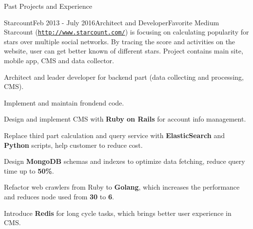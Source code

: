 \documentclass{resume} %
\newcommand{\http}{http:/\hspace{-0.3ex}/}
\begin{document}
\begin{rSection}{Past Projects and Experience}
\begin{rSubsection}{Starcount}{Feb 2013 - July 2016}{Architect and Developer}{Favorite Medium}
Starcount (\href{http://www.starcount.com/}{\tt \http{}www.starcount.com/}) is focusing on calculating popularity for stars over multiple social networks. By tracing the score and activities on the website, user can get better known of different stars. Project contains main site, mobile app, CMS and data collector.

\begin{rSubsectionList}
\item Architect and leader developer for backend part (data collecting and processing, CMS).
\item Implement and maintain frondend code.
\item Design and implement CMS with \textbf{Ruby on Rails} for account info management.
\item Replace third part calculation and query service with \textbf{ElasticSearch} and \textbf{Python} scripts, help customer to reduce cost.
\item Design \textbf{MongoDB} schemas and indexes to optimize data fetching, reduce query time up to \textbf{50\%}.
\item Refactor web crawlers from Ruby to \textbf{Golang}, which increases the performance and reduces node used from \textbf{30} to \textbf{6}.
\item Introduce \textbf{Redis} for long cycle tasks, which brings better user experience in CMS.
\end{rSubsectionList}
\end{rSubsection}


%
%



\end{rSection}
\end{document}
